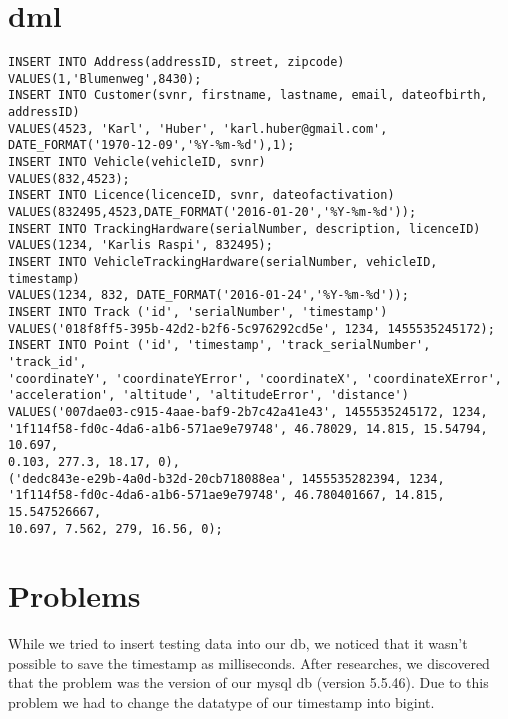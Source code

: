 \section{\gls{dml}}
\begin{verbatim}
INSERT INTO Address(addressID, street, zipcode)
VALUES(1,'Blumenweg',8430);
INSERT INTO Customer(svnr, firstname, lastname, email, dateofbirth, addressID)
VALUES(4523, 'Karl', 'Huber', 'karl.huber@gmail.com',
DATE_FORMAT('1970-12-09','%Y-%m-%d'),1);
INSERT INTO Vehicle(vehicleID, svnr)
VALUES(832,4523);
INSERT INTO Licence(licenceID, svnr, dateofactivation)
VALUES(832495,4523,DATE_FORMAT('2016-01-20','%Y-%m-%d'));
INSERT INTO TrackingHardware(serialNumber, description, licenceID)
VALUES(1234, 'Karlis Raspi', 832495);
INSERT INTO VehicleTrackingHardware(serialNumber, vehicleID, timestamp)
VALUES(1234, 832, DATE_FORMAT('2016-01-24','%Y-%m-%d'));
INSERT INTO Track ('id', 'serialNumber', 'timestamp') 
VALUES('018f8ff5-395b-42d2-b2f6-5c976292cd5e', 1234, 1455535245172);
INSERT INTO Point ('id', 'timestamp', 'track_serialNumber', 'track_id', 
'coordinateY', 'coordinateYError', 'coordinateX', 'coordinateXError', 
'acceleration', 'altitude', 'altitudeError', 'distance') 
VALUES('007dae03-c915-4aae-baf9-2b7c42a41e43', 1455535245172, 1234, 
'1f114f58-fd0c-4da6-a1b6-571ae9e79748', 46.78029, 14.815, 15.54794, 10.697, 
0.103, 277.3, 18.17, 0),
('dedc843e-e29b-4a0d-b32d-20cb718088ea', 1455535282394, 1234, 
'1f114f58-fd0c-4da6-a1b6-571ae9e79748', 46.780401667, 14.815, 15.547526667, 
10.697, 7.562, 279, 16.56, 0);
\end{verbatim}
\section{Problems}
While we tried to insert testing data into our \gls{db}, we noticed that it wasn’t possible to save the timestamp as milliseconds. After researches, we discovered that the problem was the version of our \gls{mysql} \gls{db} (version 5.5.46). Due to this problem we had to change the datatype of our timestamp into bigint.